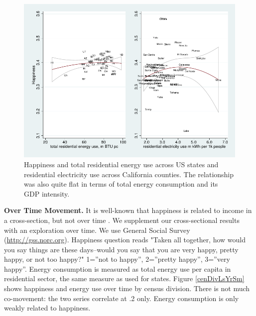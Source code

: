 \documentclass[10pt, letterpaper]{article}
\begin{document}
\begin{spacing}{1.4}
\begin{figure}[H]
 \includegraphics[width=6in]{graphsAndTables/stateCa.pdf}\centering
\caption{Happiness and total residential energy use across US states and
  residential electricity use across   
  California counties. %
 The relationship was also quite flat in terms of total energy consumption and its GDP intensity.
}\label{stateCaPAP}
 \end{figure} %

{\bf Over Time Movement.} It is well-known that happiness is related to income
in  a 
cross-section, but not over time \cite{easterlin74,easterlin12}. We
supplement our cross-sectional results with an exploration over time. We use General
Social Survey (\url{http://gss.norc.org}).   %
Happiness question reads "Taken all together, how would you say things are
      these days--would you say that you are very happy, pretty happy, or not
      too happy?" 1=''not to happy'', 2=''pretty happy'', 3=''very happy''. 
 Energy consumption is measured as total energy use per capita in
residential sector, the same measure as used for states. 
Figure \ref{cenDivLsYrSm} shows happiness and energy use over time by
census division. There is not much co-movement: the two series correlate at
.2 only. Energy consumption is only weakly related to happiness. 


\end{spacing}
\end{document}

